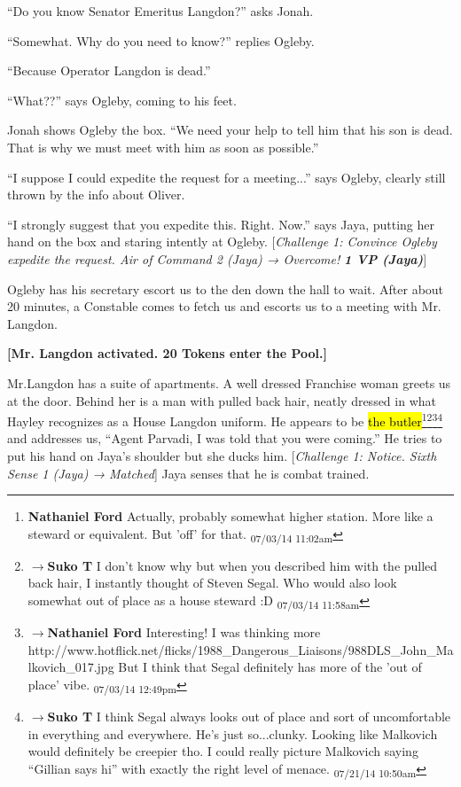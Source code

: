 ``Do you know Senator Emeritus Langdon?'' asks Jonah.

``Somewhat. Why do you need to know?'' replies Ogleby.

``Because Operator Langdon is dead.''

``What??'' says Ogleby, coming to his feet.

Jonah shows Ogleby the box.  ``We need your help to tell him that his son is dead.  That is why we must meet with him as soon as possible.''

``I suppose I could expedite the request for a meeting...'' says Ogleby, clearly still thrown by the info about Oliver.

``I strongly suggest that you expedite this. Right.  Now.'' says Jaya, putting her hand on the box and staring intently at Ogleby. {[}\textit{Challenge 1: Convince Ogleby expedite the request. Air of   Command 2 (Jaya) → Overcome! }\textit{\textbf{1 VP (Jaya)}}{]} 

Ogleby has his secretary escort us to the den down the hall to wait.  After about 20 minutes, a Constable comes to fetch us and escorts us to a meeting with Mr. Langdon.



\textbf{{[}Mr. Langdon activated.  20 Tokens enter the Pool.{]}}



Mr.Langdon has a suite of apartments.  A well dressed Franchise woman greets us at the door.  Behind her is a man with pulled back hair, neatly dressed in what Hayley recognizes as a House Langdon uniform.  He appears to be \hl{the butler}\footnote{\textbf{Nathaniel Ford }Actually, probably somewhat higher station. More like a steward or equivalent. But 'off' for that. \textsubscript{07/03/14 11:02am}}\footnote{$\rightarrow$\textbf{Suko T }I don't know why but when you described him with the pulled back hair, I instantly thought of Steven Segal.  Who would also look somewhat out of place as a house steward :D \textsubscript{07/03/14 11:58am}}\footnote{$\rightarrow$\textbf{Nathaniel Ford }Interesting! I was thinking more http://www.hotflick.net/flicks/1988\_Dangerous\_Liaisons/988DLS\_John\_Malkovich\_017.jpg But I think that Segal definitely has more of the 'out of place' vibe. \textsubscript{07/03/14 12:49pm}}\footnote{$\rightarrow$\textbf{Suko T }I think Segal always looks out of place and sort of uncomfortable in everything and everywhere.  He's just so...clunky.  Looking like Malkovich would definitely be creepier tho.  I could really picture Malkovich saying ``Gillian says hi'' with exactly the right level of menace. \textsubscript{07/21/14 10:50am}} and addresses us, ``Agent Parvadi, I was told that you were coming.''  He tries to put his hand on Jaya's shoulder but she ducks him. {[}\textit{Challenge 1: Notice. Sixth Sense 1 (Jaya) → Matched}{]}  Jaya senses that he is combat trained. 



